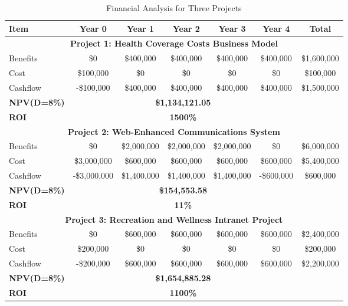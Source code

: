 \begin{table}[ht]
    \centering
    \caption{Financial Analysis for Three Projects}
    \label{tab:financial_analysis}
    \begin{tabular}{lcccccc}
    \toprule
    \textbf{Item} & \textbf{Year 0} & \textbf{Year 1} & \textbf{Year 2} & \textbf{Year 3} & \textbf{Year 4} & \textbf{Total} \\
    \midrule
    \multicolumn{7}{c}{\textbf{Project 1: Health Coverage Costs Business Model}} \\
    \midrule
    Benefits & \$0 & \$400,000 & \$400,000 & \$400,000 & \$400,000 & \$1,600,000 \\
    Cost & \$100,000 & \$0 & \$0 & \$0 & \$0 & \$100,000 \\
    Cashflow & -\$100,000 & \$400,000 & \$400,000 & \$400,000 & \$400,000 & \$1,500,000 \\
    \textbf{NPV(D=8\%)} & \multicolumn{5}{c}{\textbf{\$1,134,121.05}} \\
    \textbf{ROI} & \multicolumn{5}{c}{\textbf{1500\%}} \\
    \midrule
    \multicolumn{7}{c}{\textbf{Project 2: Web-Enhanced Communications System}} \\
    \midrule
    Benefits & \$0 & \$2,000,000 & \$2,000,000 & \$2,000,000 & \$0 & \$6,000,000 \\
    Cost & \$3,000,000 & \$600,000 & \$600,000 & \$600,000 & \$600,000 & \$5,400,000 \\
    Cashflow & -\$3,000,000 & \$1,400,000 & \$1,400,000 & \$1,400,000 & -\$600,000 & \$600,000 \\
    \textbf{NPV(D=8\%)} & \multicolumn{5}{c}{\textbf{\$154,553.58}} \\
    \textbf{ROI} & \multicolumn{5}{c}{\textbf{11\%}} \\
    \midrule
    \multicolumn{7}{c}{\textbf{Project 3: Recreation and Wellness Intranet Project}} \\
    \midrule
    Benefits & \$0 & \$600,000 & \$600,000 & \$600,000 & \$600,000 & \$2,400,000 \\
    Cost & \$200,000  & \$0 & \$0 & \$0 & \$0 & \$200,000  \\
    Cashflow & -\$200,000  & \$600,000 & \$600,000 & \$600,000 & \$600,000 & \$2,200,000 \\
    \textbf{NPV(D=8\%)} & \multicolumn{5}{c}{\textbf{\$1,654,885.28}} \\
    \textbf{ROI} & \multicolumn{5}{c}{\textbf{1100\%}} \\
    \bottomrule
    \end{tabular}
\end{table}


